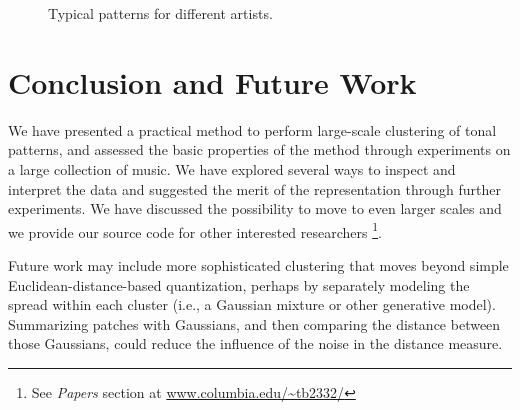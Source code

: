 \documentclass{article}
\begin{document}
\begin{figure}[h]
  \centering
  \hspace{5mm}                
  \vspace{2mm}
  \caption{\small{Typical patterns for different artists.}}
  \label{fig:typicalpat}
\end{figure}



\section{Conclusion and Future Work}
We have presented a practical method to perform large-scale clustering of
tonal patterns, and assessed the basic properties of the method through
experiments on a large collection of music. We have explored several ways
to inspect and interpret the data 
and suggested the merit of the representation
through further experiments.
We have discussed the possibility to move to even larger scales
and we provide our source code for other interested researchers
\footnote{See \textit{Papers} section at \url{www.columbia.edu/~tb2332/}}.

Future work may include more sophisticated clustering that moves 
beyond simple Euclidean-distance-based quantization, perhaps 
by separately modeling the spread within each cluster (i.e., a Gaussian 
mixture or other generative model). 
Summarizing patches
with Gaussians, and then comparing the distance between those Gaussians,
could reduce the influence of the noise in the distance measure.
\end{document}
